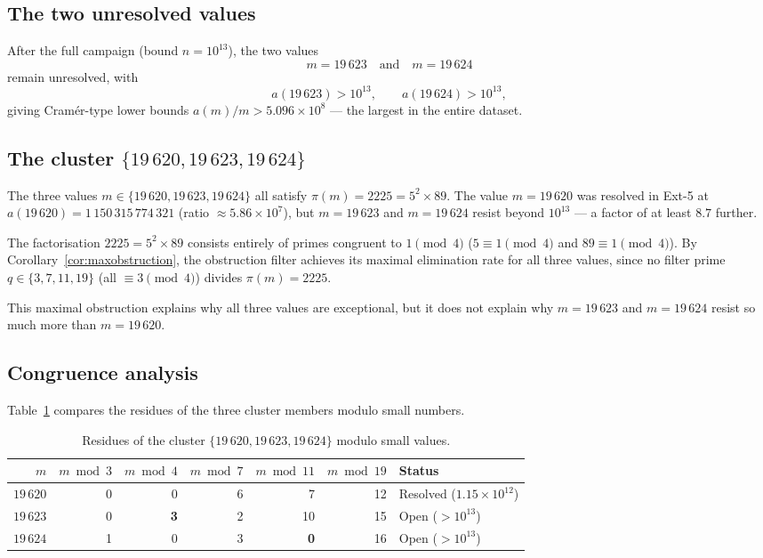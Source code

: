 \documentclass{amsart}
\theoremstyle{definition}
\theoremstyle{remark}
\numberwithin{equation}{section}
\begin{document}
\subsection{The two unresolved values}

After the full campaign (bound $n = 10^{13}$), the two values
\begin{equation}\label{eq:open}
m = 19\,623 \quad\text{and}\quad m = 19\,624
\end{equation}
remain unresolved, with
\[
a(19\,623) > 10^{13}, \qquad a(19\,624) > 10^{13},
\]
giving Cram\'er-type lower bounds
$a(m)/m > 5.096 \times 10^8$ --- the largest in the entire dataset.

\subsection{The cluster $\{19\,620, 19\,623, 19\,624\}$}

The three values $m \in \{19\,620, 19\,623, 19\,624\}$ all satisfy
$\pi(m) = 2225 = 5^2 \times 89$.  The value $m = 19\,620$ was
resolved in Ext-5 at $a(19\,620) = 1\,150\,315\,774\,321$
(ratio $\approx 5.86 \times 10^7$), but $m = 19\,623$ and
$m = 19\,624$ resist beyond $10^{13}$ --- a factor of at least
$8.7$ further.

The factorisation $2225 = 5^2 \times 89$ consists entirely of
primes congruent to $1 \pmod{4}$ ($5 \equiv 1 \pmod{4}$ and
$89 \equiv 1 \pmod{4}$).  By Corollary~\ref{cor:maxobstruction},
the obstruction filter achieves its maximal elimination rate for
all three values, since no filter prime $q \in \{3, 7, 11, 19\}$
(all $\equiv 3 \pmod{4}$) divides $\pi(m) = 2225$.

This maximal obstruction explains why all three values are
exceptional, but it does not explain why $m = 19\,623$ and
$m = 19\,624$ resist so much more than $m = 19\,620$.

\subsection{Congruence analysis}

Table~\ref{tab:congruences} compares the residues of the three
cluster members modulo small numbers.

\begin{table}[ht]
\centering
\caption{Residues of the cluster $\{19\,620, 19\,623, 19\,624\}$
modulo small values.}
\label{tab:congruences}
\begin{tabular}{rrrrrrl}
\toprule
$m$ & $m \bmod 3$ & $m \bmod 4$ & $m \bmod 7$ & $m \bmod 11$
  & $m \bmod 19$ & Status \\
\midrule
$19\,620$ & 0 & 0 & 6 & 7 & 12 & Resolved ($1.15 \times 10^{12}$) \\
$19\,623$ & 0 & \textbf{3} & 2 & 10 & 15 & Open ($> 10^{13}$) \\
$19\,624$ & 1 & 0 & 3 & \textbf{0} & 16 & Open ($> 10^{13}$) \\
\bottomrule
\end{tabular}
\end{table}
\end{document}
